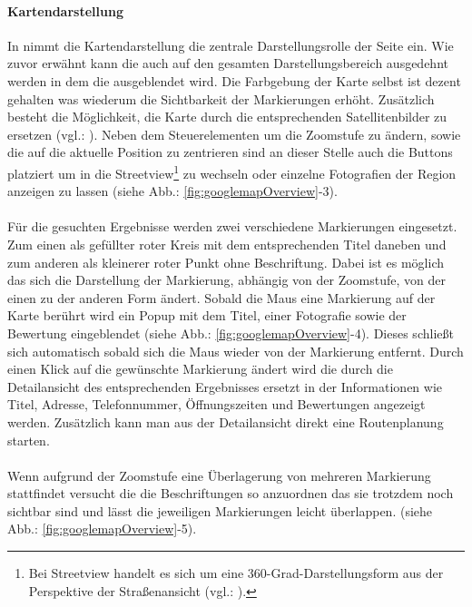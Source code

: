\documentclass[../Bachelorarbeit.tex]{subfiles}
\begin{document}
\paragraph{Kartendarstellung}
\label{gmapsMap}
In  nimmt die Kartendarstellung die zentrale Darstellungsrolle der Seite ein. 
Wie zuvor erwähnt kann die  auch auf den  gesamten Darstellungsbereich ausgedehnt werden in dem die  ausgeblendet wird.
Die Farbgebung der Karte selbst ist dezent gehalten was wiederum die Sichtbarkeit der Markierungen erhöht.
Zusätzlich besteht die Möglichkeit, die Karte durch die entsprechenden Satellitenbilder zu ersetzen (vgl.: \cite{GoogleMapsEarthView}).
Neben dem Steuerelementen um die Zoomstufe zu ändern, sowie die  auf die aktuelle Position zu zentrieren sind an dieser Stelle auch die Buttons platziert um in die Streetview\footnote{
		Bei Streetview handelt es sich um eine 360-Grad-Darstellungsform aus der Perspektive der Straßenansicht (vgl.: \cite{GoogleMapsStreetview}). 
	}
zu wechseln oder einzelne Fotografien der Region anzeigen zu lassen (siehe Abb.: \ref{fig:googlemapOverview}-3).\\
\\
Für die gesuchten Ergebnisse werden zwei verschiedene Markierungen eingesetzt. 
Zum einen als gefüllter roter Kreis mit dem entsprechenden Titel daneben und zum anderen als kleinerer roter Punkt ohne Beschriftung. 
Dabei ist es möglich das sich die Darstellung der Markierung, abhängig von der Zoomstufe, von der einen zu der anderen Form ändert.
Sobald die Maus eine Markierung auf der Karte berührt wird ein Popup mit dem Titel, einer Fotografie sowie der Bewertung eingeblendet (siehe Abb.: \ref{fig:googlemapOverview}-4).
Dieses schließt sich automatisch sobald sich die Maus wieder von der Markierung entfernt. 
Durch einen Klick auf die gewünschte Markierung ändert wird die  durch die Detailansicht des entsprechenden Ergebnisses ersetzt in der Informationen wie Titel, Adresse, Telefonnummer, Öffnungszeiten und Bewertungen angezeigt werden.
Zusätzlich kann man aus der Detailansicht direkt eine Routenplanung starten. \\
\\
Wenn aufgrund der Zoomstufe eine Überlagerung von mehreren Markierung stattfindet versucht die  die Beschriftungen so anzuordnen das sie trotzdem noch sichtbar sind und lässt die jeweiligen Markierungen leicht überlappen.
(siehe Abb.: \ref{fig:googlemapOverview}-5).\\
\end{document}
